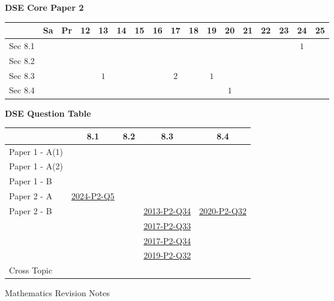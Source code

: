 \documentclass[12pt, a4paper]{article}
\begin{document}
\begin{absolutelynopagebreak}
\begin{center}
\textbf{DSE Core Paper 2}
\end{center}
\begin{center}
\begin{tabular}{|l|c|c|c|c|c|c|c|c|c|c|c|c|c|c|c|c|}
\hline
        & Sa & Pr & 12 & 13 & 14 & 15 & 16 & 17 & 18 & 19 & 20 & 21 & 22 & 23 & 24 & 25 \\\hline\hline
Sec 8.1 &  &  &  &  &  &  &  &  &  &  &  &  &  &  &  $1$ &  \\\hline
Sec 8.2 &  &  &  &  &  &  &  &  &  &  &  &  &  &  &  &  \\\hline
Sec 8.3 &  &  &  &  $1$ &  &  &  &  $2$ &  &  $1$ &  &  &  &  &  &  \\\hline
Sec 8.4 &  &  &  &  &  &  &  &  &  &  &  $1$ &  &  &  &  &  \\\hline
\end{tabular}
\end{center}
\end{absolutelynopagebreak}
\begin{absolutelynopagebreak}
\begin{center}
\textbf{DSE Question Table}
\end{center}
\begin{center}
\begin{tabular}{|l|c|c|c|c|}
\hline
        & 8.1 & 8.2 & 8.3 & 8.4 \\\hline
\hline
Paper 1 - A(1)&  &  &  &  \\
\hline
Paper 1 - A(2)&  &  &  &  \\
\hline
Paper 1 - B&  &  &  &  \\
\hline
\hline
Paper 2 - A& \hyperref[DSE2024-CoreP2-Q05]{2024-P2-Q5} &  &  &  \\
\hline
Paper 2 - B&  &  & \hyperref[DSE2013-CoreP2-Q34]{2013-P2-Q34} & \hyperref[DSE2020-CoreP2-Q32]{2020-P2-Q32} \\
&  &  & \hyperref[DSE2017-CoreP2-Q33]{2017-P2-Q33} &  \\
&  &  & \hyperref[DSE2017-CoreP2-Q34]{2017-P2-Q34} &  \\
&  &  & \hyperref[DSE2019-CoreP2-Q32]{2019-P2-Q32} &  \\
\hline
\hline
Cross Topic&  &  &  &  \\
\hline
\end{tabular}
\end{center}
\end{absolutelynopagebreak}
\newpage
\newpage
\thispagestyle{empty}
\begin{center}
Mathematics Revision Notes\\\vspace{1cm}
\\\vspace{1cm}
{\fontsize{24pt}{24pt}\selectfont {Variations}} \\\vspace{1cm}
\label{chapter:S4-9}

\end{center}
\vspace{0.5cm}
\hline
\end{document}
